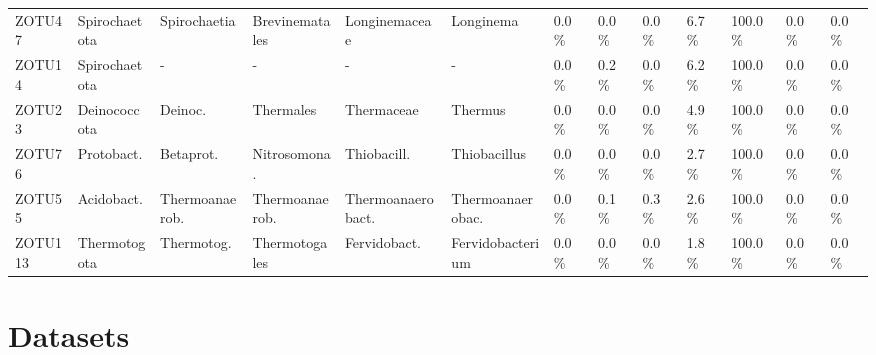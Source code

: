 \begin{table}
\begin{adjustbox}{max width=0.7\textwidth, max totalheight=0.85\textheight, keepaspectratio}
\begin{tabular}{llllllllll||lll}
ZOTU47  & Spirochaetota  & Spirochaetia   & Brevinematales & Longinemaceae   & Longinema    & \SI{0.0}{\percent}   & \SI{0.0}{\percent}  & \SI{0.0}{\percent}  & \SI{6.7}{\percent}   & \SI{100.0}{\percent} & \SI{0.0}{\percent}  & \SI{0.0}{\percent} \\
ZOTU14  & Spirochaetota  & -              & -              & -               & -            & \SI{0.0}{\percent}   & \SI{0.2}{\percent}  & \SI{0.0}{\percent}  & \SI{6.2}{\percent}   & \SI{100.0}{\percent} & \SI{0.0}{\percent}  & \SI{0.0}{\percent} \\
ZOTU23  & Deinococcota   & Deinoc.        & Thermales      & Thermaceae      & Thermus      & \SI{0.0}{\percent}   & \SI{0.0}{\percent}  & \SI{0.0}{\percent}  & \SI{4.9}{\percent}   & \SI{100.0}{\percent} & \SI{0.0}{\percent}  & \SI{0.0}{\percent} \\
ZOTU76  & Protobact.     & Betaprot.      & Nitrosomona.   & Thiobacill.     & Thiobacillus & \SI{0.0}{\percent}   & \SI{0.0}{\percent}  & \SI{0.0}{\percent}  & \SI{2.7}{\percent}   & \SI{100.0}{\percent} & \SI{0.0}{\percent}  & \SI{0.0}{\percent} \\
ZOTU55  & Acidobact.     & Thermoanaerob. & Thermoanaerob. & Thermoanaerobact. & Thermoanaerobac. & \SI{0.0}{\percent} & \SI{0.1}{\percent}   & \SI{0.3}{\percent}   & \SI{2.6}{\percent}   & \SI{100.0}{\percent} & \SI{0.0}{\percent}  & \SI{0.0}{\percent} \\
ZOTU113 & Thermotogota   & Thermotog.     & Thermotogales  & Fervidobact.    & Fervidobacterium & \SI{0.0}{\percent}   & \SI{0.0}{\percent}   & \SI{0.0}{\percent}   & \SI{1.8}{\percent}   & \SI{100.0}{\percent} & \SI{0.0}{\percent}  & \SI{0.0}{\percent} \\
\bottomrule
\end{tabular}
\end{adjustbox}
\end{table}

\newpage
\section{Datasets}



